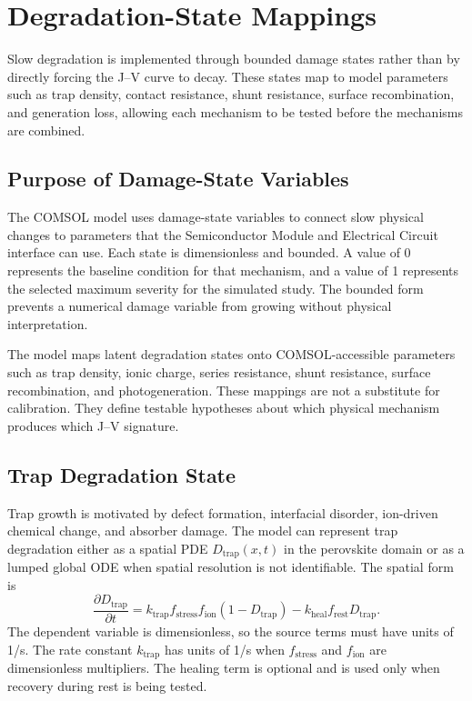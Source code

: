 \chapter{Degradation-State Mappings}

Slow degradation is implemented through bounded damage states rather than by
directly forcing the J--V curve to decay. These states map to model parameters
such as trap density, contact resistance, shunt resistance, surface
recombination, and generation loss, allowing each mechanism to be tested before
the mechanisms are combined.

\section{Purpose of Damage-State Variables}

The COMSOL model uses damage-state variables to connect slow physical changes
to parameters that the Semiconductor Module and Electrical Circuit interface can
use. Each state is dimensionless and bounded. A value of 0 represents the
baseline condition for that mechanism, and a value of 1 represents the selected
maximum severity for the simulated study. The bounded form prevents a numerical
damage variable from growing without physical interpretation.

The model maps latent degradation states onto COMSOL-accessible parameters such
as trap density, ionic charge, series resistance, shunt resistance, surface
recombination, and photogeneration. These mappings are not a substitute for
calibration. They define testable hypotheses about which physical mechanism
produces which J--V signature.

\section{Trap Degradation State}

Trap growth is motivated by defect formation, interfacial disorder, ion-driven
chemical change, and absorber damage. The model can represent trap degradation
either as a spatial PDE $D_{\mathrm{trap}}(x,t)$ in the perovskite domain or as
a lumped global ODE when spatial resolution is not identifiable. The spatial
form is
\begin{equation}
\frac{\partial D_{\mathrm{trap}}}{\partial t}
= k_{\mathrm{trap}} f_{\mathrm{stress}} f_{\mathrm{ion}}
\left(1-D_{\mathrm{trap}}\right)
- k_{\mathrm{heal}} f_{\mathrm{rest}}D_{\mathrm{trap}}.
\label{eq:dtrap}
\end{equation}
The dependent variable is dimensionless, so the source terms must have units of
1/s. The rate constant $k_{\mathrm{trap}}$ has units of 1/s when
$f_{\mathrm{stress}}$ and $f_{\mathrm{ion}}$ are dimensionless multipliers.
The healing term is optional and is used only when recovery during rest is
being tested.

